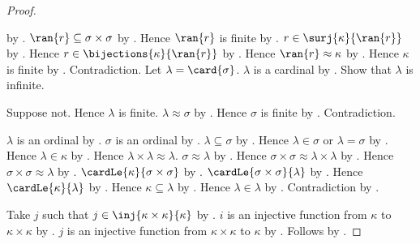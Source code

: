 \begin{proof}
\begin{subproof}
\begin{byCase}
                    by .
                $\ran{r}\subseteq\sigma\times\sigma$
                    by .
                Hence $\ran{r}$ is finite
                    by .
                $r\in\surj{\kappa}{\ran{r}}$
                    by .
                Hence $r\in\bijections{\kappa}{\ran{r}}$
                    by .
                Hence $\ran{r}\approx\kappa$
                    by .
                Hence $\kappa$ is finite
                    by .
                Contradiction.
                Let $\lambda=\card{\sigma}$.
                $\lambda$ is a cardinal by .
                Show that $\lambda$ is infinite.
                \begin{subproof}
                    Suppose not.
                    Hence $\lambda$ is finite.
                    $\lambda\approx\sigma$ by .
                    Hence $\sigma$ is finite
                        by .
                    Contradiction.
                \end{subproof}
                $\lambda$ is an ordinal
                    by .
                $\sigma$ is an ordinal
                    by .
                $\lambda\subseteq\sigma$
                    by .
                Hence $\lambda\in\sigma$ or $\lambda=\sigma$
                    by .
                Hence $\lambda\in\kappa$ by .
                Hence $\lambda\times\lambda\approx\lambda$.
                $\sigma\approx\lambda$ by .
                Hence $\sigma\times\sigma\approx
                    \lambda\times\lambda$
                    by .
                Hence $\sigma\times\sigma\approx\lambda$
                    by .
                $\cardLe{\kappa}{\sigma\times\sigma}$
                    by .
                $\cardLe{\sigma\times\sigma}{\lambda}$
                    by .
                Hence $\cardLe{\kappa}{\lambda}$
                    by .
                Hence $\kappa\subseteq\lambda$
                    by .
                Hence $\lambda\in\lambda$ by .
                Contradiction by .
        \end{byCase}
    \end{subproof}
    Take $j$ such that $j\in\inj{\kappa\times\kappa}{\kappa}$
        by .
    $i$ is an injective function from $\kappa$ to $\kappa\times\kappa$
        by .
    $j$ is an injective function from $\kappa\times\kappa$ to $\kappa$
        by .
    Follows by .
\end{proof}

